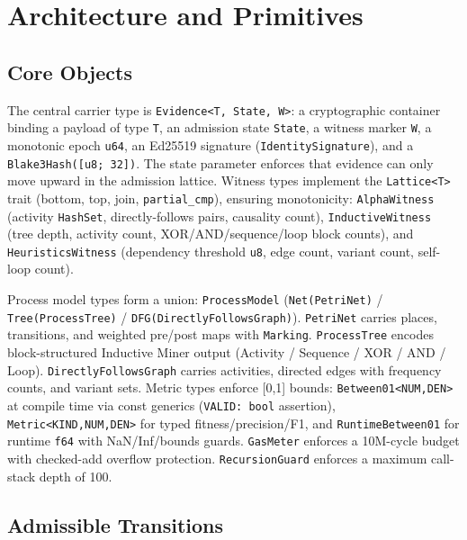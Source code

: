 \section{Architecture and Primitives}
\label{sec:sources-wasm4pm-architecture}

\subsection{Core Objects}
\label{sec:sources-wasm4pm-arch-core-objects}

The central carrier type is \texttt{Evidence<T,~State,~W>}: a cryptographic container binding a
payload of type \texttt{T}, an admission state \texttt{State}, a witness marker \texttt{W}, a
monotonic epoch \texttt{u64}, an Ed25519 signature (\texttt{IdentitySignature}), and a
\texttt{Blake3Hash([u8;~32])}. The state parameter enforces that evidence can only move upward in
the admission lattice. Witness types implement the \texttt{Lattice<T>} trait (bottom, top, join,
\texttt{partial\_cmp}), ensuring monotonicity: \texttt{AlphaWitness} (activity \texttt{HashSet},
directly-follows pairs, causality count), \texttt{InductiveWitness} (tree depth, activity count,
XOR/AND/sequence/loop block counts), and \texttt{HeuristicsWitness} (dependency threshold
\texttt{u8}, edge count, variant count, self-loop count).

Process model types form a union: \texttt{ProcessModel} (\texttt{Net(PetriNet)} /
\texttt{Tree(ProcessTree)} / \texttt{DFG(DirectlyFollowsGraph)}). \texttt{PetriNet} carries
places, transitions, and weighted pre/post maps with \texttt{Marking}. \texttt{ProcessTree}
encodes block-structured Inductive Miner output (Activity / Sequence / XOR / AND / Loop).
\texttt{DirectlyFollowsGraph} carries activities, directed edges with frequency counts, and
variant sets. Metric types enforce [0,1] bounds: \texttt{Between01<NUM,DEN>} at compile time via
const generics (\texttt{VALID: bool} assertion), \texttt{Metric<KIND,NUM,DEN>} for typed
fitness/precision/F1, and \texttt{RuntimeBetween01} for runtime \texttt{f64} with NaN/Inf/bounds
guards. \texttt{GasMeter} enforces a 10M-cycle budget with checked-add overflow protection.
\texttt{RecursionGuard} enforces a maximum call-stack depth of 100.

\subsection{Admissible Transitions}
\label{sec:sources-wasm4pm-arch-transitions}

